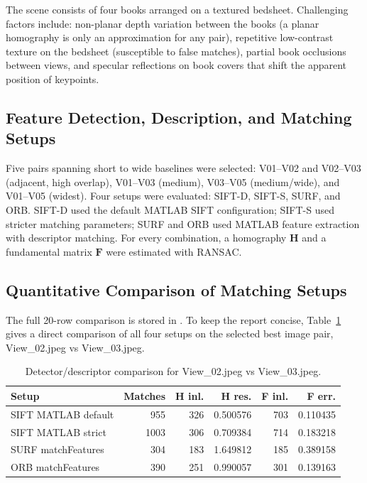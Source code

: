 \documentclass[11pt,a4paper]{article}
\begin{document}
The scene consists of four books arranged on a textured bedsheet.
Challenging factors include: non-planar depth variation between the books
(a planar homography is only an approximation for any pair), repetitive
low-contrast texture on the bedsheet (susceptible to false matches),
partial book occlusions between views, and specular reflections on book covers
that shift the apparent position of keypoints.

\subsection{Feature Detection, Description, and Matching Setups}
\label{sec:sec2_setups}

Five pairs spanning short to wide baselines were selected: V01--V02 and V02--V03
(adjacent, high overlap), V01--V03 (medium), V03--V05 (medium/wide), and
V01--V05 (widest).  Four setups were evaluated: SIFT-D, SIFT-S, SURF, and ORB.
SIFT-D used the default MATLAB SIFT configuration; SIFT-S used stricter matching
parameters; SURF and ORB used MATLAB feature extraction with descriptor matching.
For every combination, a homography $\mathbf{H}$ and a fundamental matrix
$\mathbf{F}$ were estimated with RANSAC.

\subsection{Quantitative Comparison of Matching Setups}
\label{sec:sec2_comparison}

The full 20-row comparison is stored in
.  To keep the report concise,
Table~\ref{tab:section2_four_setup_comparison} gives a direct comparison of all
four setups on the selected best image pair, View\_02.jpeg vs View\_03.jpeg.

\begin{table}[htbp]
\centering
\caption{Detector/descriptor comparison for View\_02.jpeg vs View\_03.jpeg.}
\label{tab:section2_four_setup_comparison}
\begin{tabular}{lrrrrr}
\hline
Setup & Matches & H inl. & H res. & F inl. & F err. \\
\hline
SIFT MATLAB default & 955  & 326 & 0.500576 & 703 & 0.110435 \\
SIFT MATLAB strict  & 1003 & 306 & 0.709384 & 714 & 0.183218 \\
SURF matchFeatures  & 304  & 183 & 1.649812 & 185 & 0.389158 \\
ORB matchFeatures   & 390  & 251 & 0.990057 & 301 & 0.139163 \\
\hline
\end{tabular}
\end{table}
\end{document}
